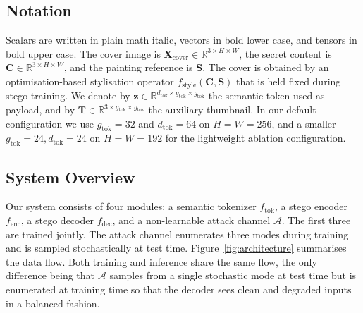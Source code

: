\documentclass[conference]{IEEEtran}
\begin{document}
\subsection{Notation}
Scalars are written in plain math italic, vectors in bold lower case, and tensors in bold upper case. The cover image is $\mathbf{X}_{\text{cover}}\!\in\!\mathbb{R}^{3\times H\times W}$, the secret content is $\mathbf{C}\!\in\!\mathbb{R}^{3\times H\times W}$, and the painting reference is $\mathbf{S}$. The cover is obtained by an optimisation-based stylisation operator $f_{\text{style}}(\mathbf{C},\mathbf{S})$ that is held fixed during stego training. We denote by $\mathbf{z}\!\in\!\mathbb{R}^{d_{\text{tok}}\times g_{\text{tok}}\times g_{\text{tok}}}$ the semantic token used as payload, and by $\mathbf{T}\!\in\!\mathbb{R}^{3\times g_{\text{tok}}\times g_{\text{tok}}}$ the auxiliary thumbnail. In our default configuration we use $g_{\text{tok}}=32$ and $d_{\text{tok}}=64$ on $H\!=\!W\!=\!256$, and a smaller $g_{\text{tok}}=24,d_{\text{tok}}=24$ on $H\!=\!W\!=\!192$ for the lightweight ablation configuration.

\subsection{System Overview}
Our system consists of four modules: a semantic tokenizer $f_{\text{tok}}$, a stego encoder $f_{\text{enc}}$, a stego decoder $f_{\text{dec}}$, and a non-learnable attack channel $\mathcal{A}$. The first three are trained jointly. The attack channel enumerates three modes during training and is sampled stochastically at test time. Figure~\ref{fig:architecture} summarises the data flow. Both training and inference share the same flow, the only difference being that $\mathcal{A}$ samples from a single stochastic mode at test time but is enumerated at training time so that the decoder sees clean and degraded inputs in a balanced fashion.
\end{document}
